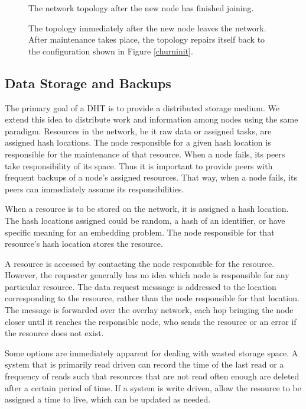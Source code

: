 \documentclass{IEEEtran}
\begin{document}
\begin{figure}
    \caption{The network topology after the new node has finished joining.}
    \label{churndone}
\end{figure}

\begin{figure}
    \caption{The topology immediately after the new node leaves the network. After maintenance takes place, the topology repairs itself back to the configuration shown in Figure \ref{churninit}.}
    \label{churndrop}
\end{figure}


\subsection{Data Storage and Backups}
The primary goal of a DHT is to provide a distributed storage medium. We extend this idea to distribute work and information among nodes using the same paradigm. Resources in the network, be it raw data or assigned tasks, are assigned hash locations. The node responsible for a given hash location is responsible for the maintenance of that resource. When a node fails, its peers take responsibility of its space. Thus it is important to provide peers with frequent backups of a node's assigned resources.  That way, when a node fails, its peers can immediately assume its responsibilities.

When a resource is to be stored on the network, it is assigned a hash location. The hash locations assigned could be random, a hash of an identifier, or have specific meaning for an embedding problem. The node responsible for that resource's hash location stores the resource.

A resource is accessed by contacting the node responsible for the resource.  However, the requester generally has no idea which node is responsible for any particular resource.  The data request messsage is addressed to the location corresponding to the resource, rather than the node responsible for that location.  The message is forwarded over the overlay network, each hop bringing the node closer until it reaches the responsible node, who sends the resource or an error if the resource does not exist.

Some options are immediately apparent for dealing with wasted storage space. A system that is primarily read driven can record the time of the last read or a frequency of reads such that resources that are not read often enough are deleted after a certain period of time. If a system is write driven, allow the resource to be assigned a time to live, which can be updated as needed.
\end{document}
